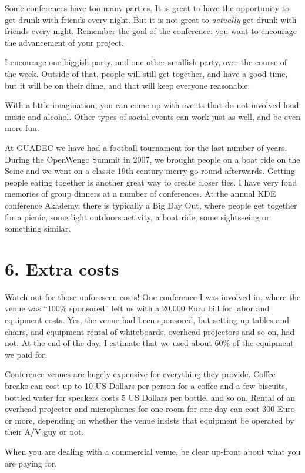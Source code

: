 Some conferences have too many parties. It is great to have the
opportunity to get drunk with friends every night. But it is not great to
\textit{actually} get drunk with friends every night. Remember the goal of the
conference: you want to encourage the advancement of your project.

I encourage one biggish party, and one other smallish party, over the
course of the week. Outside of that, people will still get together, and
have a good time, but it will be on their dime, and that will keep
everyone reasonable.

With a little imagination, you can come up with events that do not
involved loud music and alcohol. Other types of social events can work
just as well, and be even more fun.

At GUADEC we have had a football tournament for the last number of
years. During the OpenWengo Summit in 2007, we brought people on a boat
ride on the Seine and we went on a classic 19th century merry-go-round
afterwards. Getting people eating together is another great way to
create closer ties. I have very fond memories of group dinners at a
number of conferences. At the annual KDE conference Akademy, there is
typically a Big Day Out, where people get together for a picnic, some
light outdoors activity, a boat ride, some sightseeing or something similar.

\section*{6. Extra costs}

Watch out for those unforeseen costs! One conference I was involved in,
where the venue was ``100\% sponsored'' left us with a 20,000 Euro bill for
labor and equipment costs. Yes, the venue had been sponsored, but
setting up tables and chairs, and equipment rental of whiteboards,
overhead projectors and so on, had not. At the end of the day, I
estimate that we used about 60\% of the equipment we paid for.

Conference venues are hugely expensive for everything they provide.
Coffee breaks can cost up to 10 US Dollars per person for a coffee and a few
biscuits, bottled water for speakers costs 5 US Dollars per bottle, and so on.
Rental of an overhead projector and microphones for one room for one day can
cost 300 Euro or more, depending on whether the venue insists that equipment
be operated by their A/V guy or not.

When you are dealing with a commercial venue, be clear up-front about
what you are paying for.

